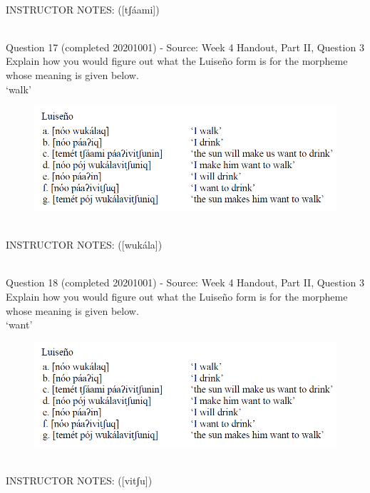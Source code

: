 \documentclass[12pt]{article}
\begin{document}
~\\
INSTRUCTOR NOTES: ([tʃáami])


~\\

{\large Question 17} (completed 20201001) - Source: Week 4 Handout, Part II, Question 3\\

Explain how you would figure out what the Luiseño form is for the morpheme whose meaning is given below.\\

‘walk’

\begin{figure}[H]
\includegraphics{../images/luiseno.png}
\end{figure}

~\\
INSTRUCTOR NOTES: ([wukála])


~\\

{\large Question 18} (completed 20201001) - Source: Week 4 Handout, Part II, Question 3\\

Explain how you would figure out what the Luiseño form is for the morpheme whose meaning is given below.\\

‘want’

\begin{figure}[H]
\includegraphics{../images/luiseno.png}
\end{figure}

~\\
INSTRUCTOR NOTES: ([vitʃu])
\end{document}
